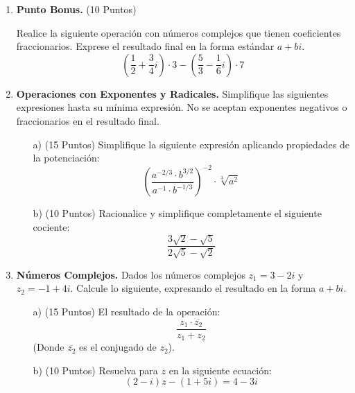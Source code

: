 \documentclass[12pt]{article}
\begin{document}
\begin{enumerate}
    \item \textbf{Punto Bonus.} (10 Puntos)
    
    Realice la siguiente operación con números complejos que tienen coeficientes fraccionarios. Exprese el resultado final en la forma estándar $a+bi$.
    \[
    \left( \frac{1}{2} + \frac{3}{4}i \right)\cdot 3 - \left( \frac{5}{3} - \frac{1}{6}i \right)\cdot 7
    \]



    \item \textbf{Operaciones con Exponentes y Radicales.} Simplifique las siguientes expresiones hasta su mínima expresión. No se aceptan exponentes negativos o fraccionarios en el resultado final.
    
    \begin{itemize}
        \item[a)] (15 Puntos) Simplifique la siguiente expresión aplicando propiedades de la potenciación:
        \[
        \left( \frac{a^{-2/3} \cdot b^{3/2}}{a^{-1} \cdot b^{-1/3}} \right)^{-2} \cdot \sqrt[3]{a^2}
        \]
        
        \item[b)] (10 Puntos) Racionalice y simplifique completamente el siguiente cociente:
        \[
        \frac{3\sqrt{2} - \sqrt{5}}{2\sqrt{5} - \sqrt{2}}
        \]
    \end{itemize}
    
    \vspace{0.5cm}

    \item \textbf{Números Complejos.} Dados los números complejos $z_1 = 3 - 2i$ y $z_2 = -1 + 4i$. Calcule lo siguiente, expresando el resultado en la forma $a+bi$.
    
    \begin{itemize}
        \item[a)] (15 Puntos) El resultado de la operación:
        \[
        \frac{z_1 \cdot \overline{z_2}}{z_1 + z_2}
        \]
        (Donde $\overline{z_2}$ es el conjugado de $z_2$).
        
        \item[b)] (10 Puntos) Resuelva para $z$ en la siguiente ecuación:
        \[
        (2-i)z - (1+5i) = 4 - 3i
        \]
    \end{itemize}
    

\end{enumerate}
\end{document}
